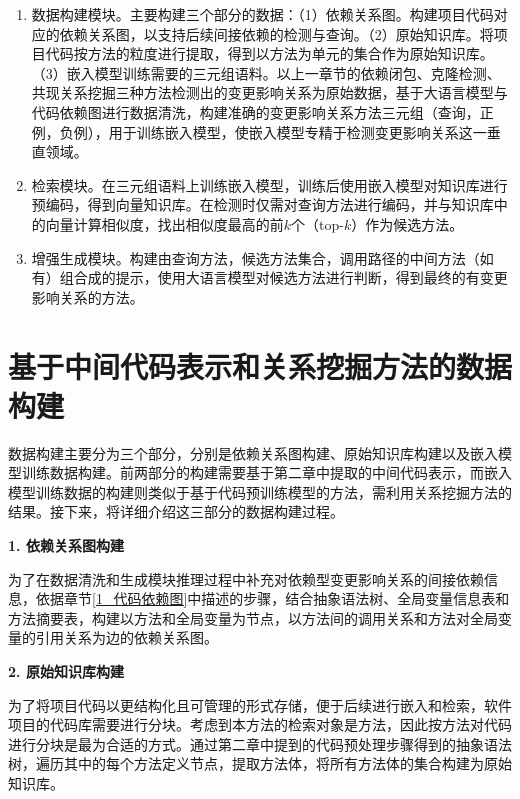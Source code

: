 \begin{enumerate}

    \item 数据构建模块。主要构建三个部分的数据：（1）依赖关系图。构建项目代码对应的依赖关系图，以支持后续间接依赖的检测与查询。（2）原始知识库。将项目代码按方法的粒度进行提取，得到以方法为单元的集合作为原始知识库。（3）嵌入模型训练需要的三元组语料。以上一章节的依赖闭包、克隆检测、共现关系挖掘三种方法检测出的变更影响关系为原始数据，基于大语言模型与代码依赖图进行数据清洗，构建准确的变更影响关系方法三元组（查询，正例，负例），用于训练嵌入模型，使嵌入模型专精于检测变更影响关系这一垂直领域。

    \item 检索模块。在三元组语料上训练嵌入模型，训练后使用嵌入模型对知识库进行预编码，得到向量知识库。在检测时仅需对查询方法进行编码，并与知识库中的向量计算相似度，找出相似度最高的前$k$个（top-$k$）作为候选方法。
    
    \item 增强生成模块。构建由查询方法，候选方法集合，调用路径的中间方法（如有）组合成的提示，使用大语言模型对候选方法进行判断，得到最终的有变更影响关系的方法。
    
\end{enumerate}




\section{基于中间代码表示和关系挖掘方法的数据构建}
\label{3_数据构建}

数据构建主要分为三个部分，分别是依赖关系图构建、原始知识库构建以及嵌入模型训练数据构建。前两部分的构建需要基于第二章中提取的中间代码表示，而嵌入模型训练数据的构建则类似于基于代码预训练模型的方法，需利用关系挖掘方法的结果。接下来，将详细介绍这三部分的数据构建过程。

\noindent \textbf{1. 依赖关系图构建}

为了在数据清洗和生成模块推理过程中补充对依赖型变更影响关系的间接依赖信息，依据章节\ref{1_代码依赖图}中描述的步骤，结合抽象语法树、全局变量信息表和方法摘要表，构建以方法和全局变量为节点，以方法间的调用关系和方法对全局变量的引用关系为边的依赖关系图。

\noindent \textbf{2. 原始知识库构建}

为了将项目代码以更结构化且可管理的形式存储，便于后续进行嵌入和检索，软件项目的代码库需要进行分块。考虑到本方法的检索对象是方法，因此按方法对代码进行分块是最为合适的方式。通过第二章中提到的代码预处理步骤得到的抽象语法树，遍历其中的每个方法定义节点，提取方法体，将所有方法体的集合构建为原始知识库。

